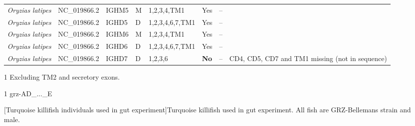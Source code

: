 \begin{landscape}
\begin{threeparttable}
\begin{tabular}{>{\itshape}lllllllp{4cm}}
  Oryzias latipes & NC\_019866.2 & IGHM5 & M & 1,2,3,4,TM1 & Yes & -- &  \\ 
  Oryzias latipes & NC\_019866.2 & IGHD5 & D & 1,2,3,4,6,7,TM1 & Yes & -- &  \\ 
  Oryzias latipes & NC\_019866.2 & IGHM6 & M & 1,2,3,4,TM1 & Yes & -- &  \\ 
  Oryzias latipes & NC\_019866.2 & IGHD6 & D & 1,2,3,4,6,7,TM1 & Yes & -- &  \\ 
  Oryzias latipes & NC\_019866.2 & IGHD7 & D & 1,2,3,6 & \textbf{No} & -- & CD4, CD5, CD7 and TM1 missing (not in sequence) \\ 
   \bottomrule \end{tabular}
	\begin{tablenotes}
	\item[1] Excluding TM2 and secretory exons.
	\end{tablenotes}
	\end{threeparttable}
	\normalsize\vspace{1em}
	\label{tab:multispecies-ch-regions-3}
    \vspace*{\fill}
    \end{landscape}


\begin{table}
\caption[Turquoise killifish individuals used in \igseq pilot and ageing experiments]{Turquoise killifish used in \igseq pilot and ageing experiments. All fish are GRZ-AD strain and male.}
\label{tab:igseq-cohorts-fish}
\begin{threeparttable}

\begin{tablenotes}
\item[1] grz-AD\_...\_E
\end{tablenotes}
\end{threeparttable}
\end{table}

\begin{landscape}
\centering
\vspace*{\fill}
\scriptsize

\normalsize\vspace{1em}
[Turquoise killifish individuals used in \igseq gut experiment]{Turquoise killifish used in \igseq gut experiment. All fish are GRZ-Bellemans strain and male.}
\label{tab:gut-cohorts-fish}
\vspace*{\fill}
\end{landscape}